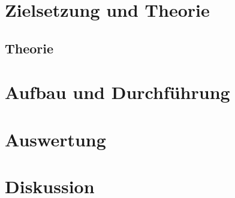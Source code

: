 





\maketitle
\tableofcontents
\newpage

\section{Zielsetzung und Theorie}



\subsection{Theorie}


\section{Aufbau und Durchführung}

% 



% 

\section{Auswertung}


\section{Diskussion}


\newpage
\nocite{*}
\printbibliography



